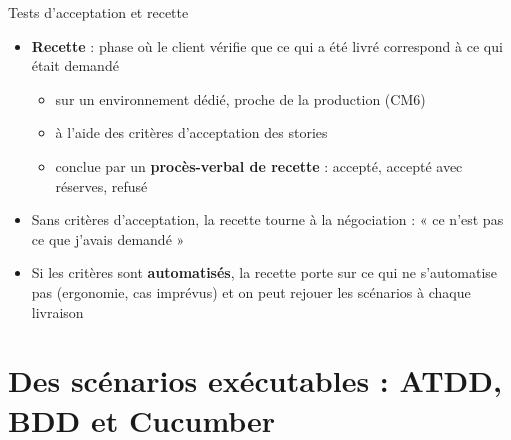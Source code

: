 \documentclass[aspectratio=169,10pt]{beamer}
\begin{document}
\begin{frame}{Tests d'acceptation et recette}
  \begin{itemize}
    \item \textbf{Recette} : phase où le client vérifie que ce qui a été livré correspond à ce qui était demandé
      \begin{itemize}
        \item sur un environnement dédié, proche de la production (CM6)
        \item à l'aide des critères d'acceptation des stories
        \item conclue par un \textbf{procès-verbal de recette} : accepté, accepté avec réserves, refusé
      \end{itemize}
    \item Sans critères d'acceptation, la recette tourne à la négociation : « ce n'est pas ce que j'avais demandé »
    \item Si les critères sont \textbf{automatisés}, la recette porte sur ce qui ne s'automatise pas (ergonomie, cas imprévus) et on peut rejouer les scénarios à chaque livraison
  \end{itemize}
\end{frame}

\section{Des scénarios exécutables : ATDD, BDD et Cucumber}
\end{document}
